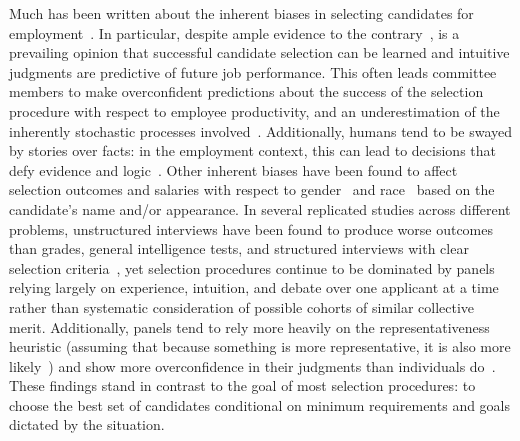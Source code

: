 \documentclass[10pt,letterpaper]{article}
\begin{document}
Much has been written about the inherent biases in selecting candidates for employment~\cite{reskin2000,riach2002,gorman2005,pager2005,krieger2006,rooth2010,kuncel2013}. In particular, despite ample evidence to the contrary~\cite{grove1996,grove2000}, is a prevailing opinion that successful candidate selection can be learned and intuitive judgments are predictive of future job performance. 
This often leads committee members to make overconfident predictions about the success of the selection procedure with respect to employee productivity, and an underestimation of the inherently stochastic processes involved~\cite{pulakos1996,kausel2016}. Additionally, humans tend to be swayed by stories over facts: in the employment context, this can lead to decisions that defy evidence and logic~\cite{highhouse1998}. Other inherent biases have been found to affect selection outcomes and salaries with respect to gender~\cite{mossracusin2012,reuben2014} and race~\cite{bertrand2004,lavergne2004} based on the candidate's name and/or appearance. In several replicated studies across different problems, unstructured interviews have been found to produce worse outcomes than grades, general intelligence tests, and structured interviews with clear selection criteria~\cite{kuncel2013,kausel2016}, yet selection procedures continue to be dominated by panels relying largely on experience, intuition, and debate over one applicant at a time~\cite{rivera2015} rather than systematic consideration of possible cohorts of similar collective merit. Additionally, panels tend to rely more heavily on the representativeness heuristic (assuming that because something is more representative, it is also more likely~\cite{kahnemann1972}) and show  more overconfidence in their judgments than individuals do~\cite{sunstein2015}.
These findings stand in contrast to the goal of most selection procedures: to choose the best set of candidates conditional on minimum requirements and goals dictated by the situation. 
\end{document}
